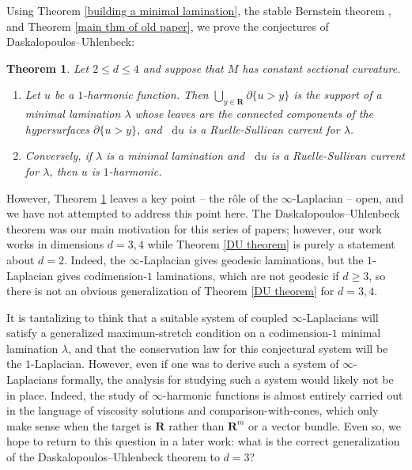 \documentclass[reqno,11pt]{amsart}
\newcommand{\RR}{\mathbf{R}}
\newcommand*\dif{\mathop{}\!\mathrm{d}}
\newtheorem{theorem}{Theorem}[section]
\theoremstyle{definition}
\numberwithin{equation}{section}
\begin{document}
Using Theorem \ref{building a minimal lamination}, the stable Bernstein theorem \cite{Schoen2016, Chodosh2021}, and Theorem \ref{main thm of old paper}, we prove the conjectures of Daskalopoulos--Uhlenbeck:

\begin{theorem}\label{main thm}
Let $2 \leq d \leq 4$ and suppose that $M$ has constant sectional curvature.
\begin{enumerate}
\item Let $u$ be a $1$-harmonic function.
Then $\bigcup_{y \in \RR} \partial \{u > y\}$ is the support of a minimal lamination $\lambda$ whose leaves are the connected components of the hypersurfaces $\partial \{u > y\}$, and $\dif u$ is a Ruelle-Sullivan current for $\lambda$.
\item Conversely, if $\lambda$ is a minimal lamination and $\dif u$ is a Ruelle-Sullivan current for $\lambda$, then $u$ is $1$-harmonic.
\end{enumerate}
\end{theorem}

However, Theorem \ref{main thm} leaves a key point -- the r\^ole of the $\infty$-Laplacian -- open, and we have not attempted to address this point here.
The Daskalopoulos--Uhlenbeck theorem was our main motivation for this series of papers; however, our work works in dimensions $d = 3, 4$ while Theorem \ref{DU theorem} is purely a statement about $d = 2$.
Indeed, the $\infty$-Laplacian gives geodesic laminations, but the $1$-Laplacian gives codimension-$1$ laminations, which are not geodesic if $d \geq 3$, so there is not an obvious generalization of Theorem \ref{DU theorem} for $d = 3, 4$.

It is tantalizing to think that a suitable system of coupled $\infty$-Laplacians will satisfy a generalized maximum-stretch condition on a codimension-$1$ minimal lamination $\lambda$, and that the conservation law for this conjectural system will be the $1$-Laplacian.
However, even if one was to derive such a system of $\infty$-Laplacians formally, the analysis for studying such a system would likely not be in place.
Indeed, the study of $\infty$-harmonic functions is almost entirely carried out in the language of viscosity solutions and comparison-with-cones, which only make sense when the target is $\RR$ rather than $\RR^m$ or a vector bundle.
Even so, we hope to return to this question in a later work: what is the correct generalization of the Daskalopoulos--Uhlenbeck theorem to $d = 3$?

\end{document}
